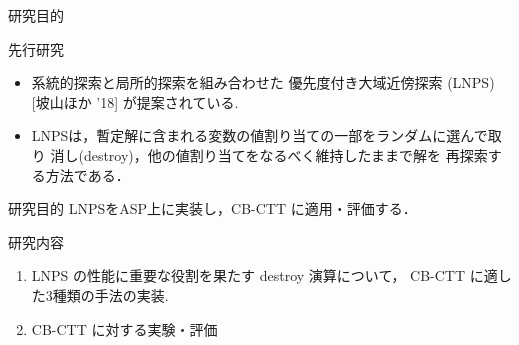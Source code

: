 \begin{frame}{研究目的}
  \begin{exampleblock}{先行研究}
    \begin{itemize}
    \item 系統的探索と局所的探索を組み合わせた
      \alert{優先度付き大域近傍探索 (LNPS)} [坡山ほか '18]
      が提案されている.
    \item LNPSは，暫定解に含まれる変数の値割り当ての一部をランダムに選んで取り
      消し(\alert{destroy})，他の値割り当てをなるべく維持したままで解を
      再探索する方法である．
    \end{itemize}
  \end{exampleblock}

  \begin{alertblock}{研究目的}
    LNPSをASP上に実装し，CB-CTT に適用・評価する．
  \end{alertblock}

  \begin{block}{研究内容}
    \begin{enumerate}
    \item LNPS の性能に重要な役割を果たす destroy 演算について，
      CB-CTT に適した3種類の手法の実装. 
    \item CB-CTT に対する実験・評価
    \end{enumerate}
  \end{block}
\end{frame}

